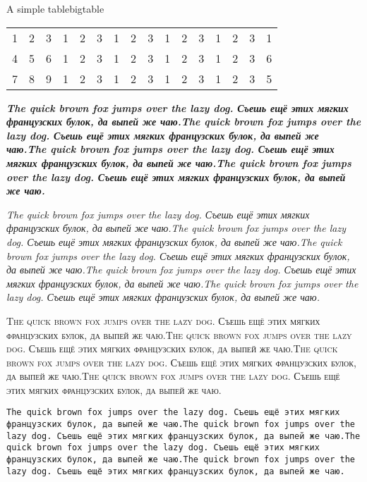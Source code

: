 \documentclass{diploma}
\begin{document}
\begin{gosttable}{A simple table}{bigtable}
	\begin{tabular}{| c c c c c c c c c c c c c c c c |}
		\hline
		1 & 2 & 3 & 1 & 2 & 3 & 1 & 2 & 3 & 1 & 2 & 3 & 1 & 2 & 3 & 1 \\
		4 & 5 & 6 & 1 & 2 & 3 & 1 & 2 & 3 & 1 & 2 & 3 & 1 & 2 & 3 & 6 \\
		7 & 8 & 9 & 1 & 2 & 3 & 1 & 2 & 3 & 1 & 2 & 3 & 1 & 2 & 3 & 5 \\
		\hline
	\end{tabular}
\end{gosttable}

\textbf{\textit{The quick brown fox jumps over the lazy dog. Съешь ещё этих мягких французских булок, да выпей же чаю.The quick brown fox jumps over the lazy dog. Съешь ещё этих мягких французских булок, да выпей же чаю.The quick brown fox jumps over the lazy dog. Съешь ещё этих мягких французских булок, да выпей же чаю.The quick brown fox jumps over the lazy dog. Съешь ещё этих мягких французских булок, да выпей же чаю.}}

\textsl{The quick brown fox jumps over the lazy dog. Съешь ещё этих мягких французских булок, да выпей же чаю.The quick brown fox jumps over the lazy dog. Съешь ещё этих мягких французских булок, да выпей же чаю.The quick brown fox jumps over the lazy dog. Съешь ещё этих мягких французских булок, да выпей же чаю.The quick brown fox jumps over the lazy dog. Съешь ещё этих мягких французских булок, да выпей же чаю.The quick brown fox jumps over the lazy dog. Съешь ещё этих мягких французских булок, да выпей же чаю.}

\textsc{The quick brown fox jumps over the lazy dog. Съешь ещё этих мягких французских булок, да выпей же чаю.The quick brown fox jumps over the lazy dog. Съешь ещё этих мягких французских булок, да выпей же чаю.The quick brown fox jumps over the lazy dog. Съешь ещё этих мягких французских булок, да выпей же чаю.The quick brown fox jumps over the lazy dog. Съешь ещё этих мягких французских булок, да выпей же чаю.}

\texttt{The quick brown fox jumps over the lazy dog. Съешь ещё этих мягких французских булок, да выпей же чаю.The quick brown fox jumps over the lazy dog. Съешь ещё этих мягких французских булок, да выпей же чаю.The quick brown fox jumps over the lazy dog. Съешь ещё этих мягких французских булок, да выпей же чаю.The quick brown fox jumps over the lazy dog. Съешь ещё этих мягких французских булок, да выпей же чаю.}
\end{document}
